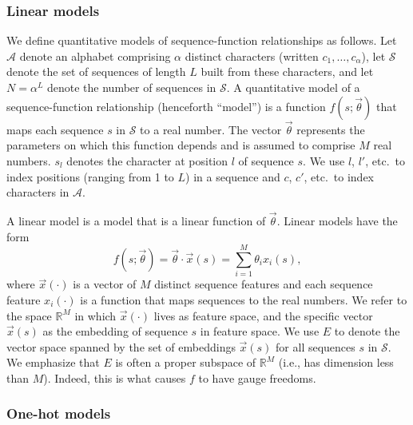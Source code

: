 \documentclass[10pt,letterpaper]{article}
\begin{document}
\subsubsection*{Linear models} 

We define quantitative models of sequence-function relationships as follows. Let $\mathcal{A}$ denote an alphabet comprising $\alpha$ distinct characters (written $c_1, \ldots, c_\alpha$), let $\mathcal{S}$ denote the set of sequences of length $L$ built from these characters, and let $N = \alpha^L$ denote the number of sequences in $\mathcal{S}$. A quantitative model of a sequence-function relationship (henceforth ``model'')  is a function $f(s; \vec{\theta})$ that maps each sequence $s$ in $\mathcal{S}$ to a real number. The vector $\vec{\theta}$ represents the parameters on which this function depends and is assumed to comprise $M$ real numbers. $s_l$ denotes the character at position $l$ of sequence $s$. We use $l$, $l'$, etc.\  to index positions (ranging from 1 to $L$) in a sequence and $c$, $c'$, etc.\ to index characters in $\mathcal{A}$. 

A linear model is a model that is a linear function of $\vec{\theta}$. Linear models have the form
\begin{equation}
    f(s;\vec{\theta}) = \vec{\theta} \cdot \vec{x}(s) = \sum_{i=1}^M \theta_i x_i(s), \label{eq:dot}
\end{equation}
where $\vec{x}(\cdot)$ is a vector of $M$ distinct sequence features and each sequence feature $x_i(\cdot)$ is a function that maps sequences to the real numbers.  We refer to the space $\mathbb{R}^M$ in which $\vec{x}(\cdot)$ lives as feature space, and the specific vector $\vec{x}(s)$ as the embedding of sequence $s$ in feature space. We use $E$ to denote the vector space spanned by the set of embeddings $\vec{x}(s)$ for all sequences $s$ in $\mathcal{S}$. We emphasize that $E$ is often a proper subspace of $\mathbb{R}^M$ (i.e., has dimension less than $M$). Indeed, this is what causes $f$ to have gauge freedoms.


\subsubsection*{One-hot models}
\end{document}

